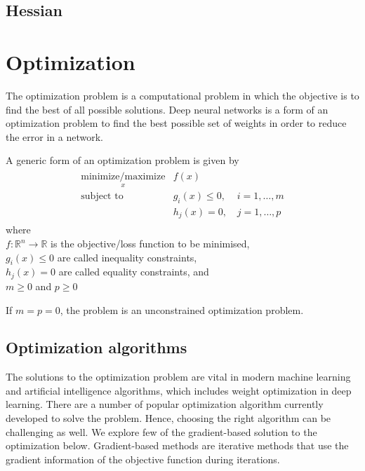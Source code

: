 \subsection{Hessian}
\section{Optimization}
The optimization problem is a computational problem in which the objective is to find the best of all possible solutions. Deep neural networks is a form of an optimization problem to find the best possible set of weights in order to reduce the error in a network.

\noindent A generic form of an optimization problem is given by 
\begin{align}
  \begin{matrix}
    \underset{x}{\text{minimize/maximize}} &f(x) & \\
    \text{subject to} &g_i(x) \leq 0, \, \, & i=1,\dots,m \\
    &h_j(x) = 0, & j=1,\dots,p
  \end{matrix}
  \label{eq:optimization_problem}
\end{align} 
\noindent where \\
\indent $f: \mathbb{R}^n \rightarrow \mathbb{R}$ is the objective/loss function to be minimised,\\
\indent $g_i(x) \leq 0$ are called inequality constraints,\\
\indent $h_j(x) = 0$ are called equality constraints, and \\
\indent $m\geq0$ and $p\geq0$

\vspace{5mm}
\noindent If $m=p=0$, the problem is an unconstrained optimization problem.
\subsection{Optimization algorithms}
The solutions to the optimization problem are vital in modern machine learning and artificial intelligence algorithms, which includes weight optimization in deep learning. There are a number of popular optimization algorithm currently developed to solve the problem. Hence, choosing the right algorithm can be challenging as well.
\vspace{5mm}
\noindent We explore few of the gradient-based solution to the optimization below. Gradient-based methods are iterative methods that use the gradient information of the objective function during iterations.

